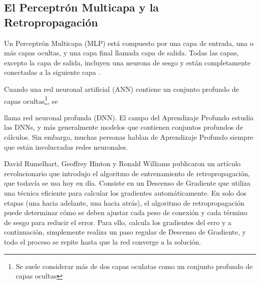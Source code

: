 \subsection{El Perceptrón Multicapa y la Retropropagación}

Un Perceptrón Multicapa (MLP) está compuesto por una capa de entrada, una o más capas ocultas, y una capa final llamada capa de salida. Todas las capas, excepto la capa de salida, incluyen una neurona de sesgo y están completamente conectadas a la siguiente capa \citep{geron2022hands}.

Cuando una red neuronal artificial (ANN) contiene un conjunto profundo de capas ocultas\footnote{Se suele considerar más de dos capas oculatas como un conjunto profundo de capas ocultas}, se 
\begin{minipage}{0.54\textwidth}
llama red neuronal profunda (DNN). El campo del Aprendizaje Profundo estudia las DNNs, y más generalmente modelos que contienen conjuntos profundos de cálculos. Sin embargo, muchas personas hablan de Aprendizaje Profundo siempre que están involucradas redes neuronales.

\bigskip

David Rumelhart, Geoffrey Hinton y Ronald Williams publicaron un artículo revolucionario que introdujo el algoritmo de entrenamiento de retropropagación, que todavía se usa hoy en día. Consiste en un Descenso de Gradiente que utiliza una técnica eficiente para calcular los gradientes automáticamente. En solo dos etapas (una hacia adelante, una hacia atrás), el algoritmo de retropropagación puede determinar cómo se deben ajustar cada peso de conexión y cada término de sesgo para reducir el error. Para ello, calcula los gradientes del erro y a continuación, simplemente realiza un paso regular de Descenso de Gradiente, y todo el proceso se repite hasta que la red converge a la solución.

\end{minipage}
\begin{minipage}{0.05\textwidth}
\textbf{ }
\end{minipage}
